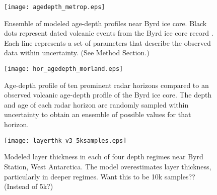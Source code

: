 \documentclass[12pt]{article}
\begin{document}
\begin{figure}
\begin{center}
\texttt{[image: agedepth\_metrop.eps]}
\label{spaghetti}
\captionsetup{width=.9\textwidth}
\caption{ Ensemble of modeled age-depth profiles near Byrd ice core.  Black dots represent dated volcanic events from the Byrd ice core record \citep{hammer1994}. Each line represents a set of parameters that describe the observed data within uncertainty. (See Method Section.)   }
\end{center}
\end{figure}

\begin{figure}
\begin{center}
\texttt{[image: hor\_agedepth\_morland.eps]}
\label{horagedepth}
\captionsetup{width=.9\textwidth}
\caption{ Age-depth profile of ten prominent radar horizons compared to an observed volcanic age-depth profile of the Byrd ice core. The depth and age of each radar horizon are randomly sampled within uncertainty to obtain an ensemble of possible values for that horizon.  }
\end{center}
\end{figure}


\begin{figure}\label{accum}
\begin{center}
\texttt{[image: layerthk\_v3\_5ksamples.eps]}
\end{center}
\captionsetup{width=.9\textwidth}
\caption{Modeled layer thickness in each of four depth regimes near Byrd Station, West Antarctica. The model overestimates layer thickness, particularly in deeper regimes. 
Want this to be 10k samples?? (Instead of 5k?)}
\end{figure}
\end{document}
